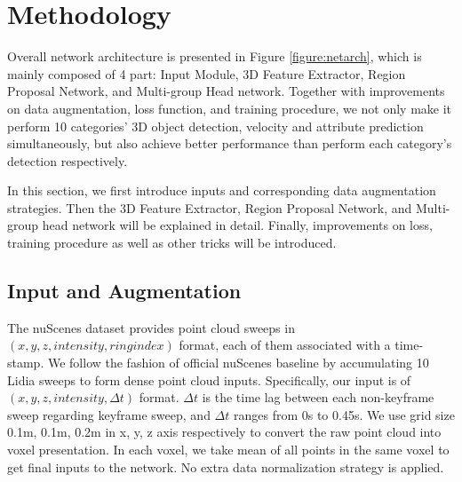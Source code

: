 \documentclass[10pt,twocolumn,letterpaper]{article}
\begin{document}
\section{Methodology} \label{sec:method}
Overall network architecture is presented in Figure \ref{figure:netarch}, which is mainly composed of 4 part: Input Module, 3D Feature Extractor, Region Proposal Network, and Multi-group Head network. Together with improvements on data augmentation, loss function, and training procedure, we not only make it perform 10 categories' 3D object detection, velocity and attribute prediction simultaneously, but also achieve better performance than perform each category's detection respectively.


In this section, we first introduce inputs and corresponding data augmentation strategies. Then the 3D Feature Extractor, Region Proposal Network, and Multi-group head network will be explained in detail. Finally, improvements on loss, training procedure as well as other tricks will be introduced.

\subsection{Input and Augmentation} \label{datasetaug}

The nuScenes dataset provides point cloud sweeps in $(x, y, z, intensity, ring index)$ format, each of them associated with a time-stamp. We follow the fashion of official nuScenes baseline \cite{nuscenes}  by accumulating 10 Lidia sweeps to form dense point cloud inputs. Specifically, our input is of $(x, y, z, intensity, \Delta t)$ format. $\Delta t$ is the time lag between each non-keyframe sweep regarding keyframe sweep, and $\Delta t$ ranges from 0s to 0.45s. We use grid size 0.1m, 0.1m, 0.2m in x, y, z axis respectively to convert the raw point cloud into voxel presentation. In each voxel, we take mean of all points in the same voxel to get final inputs to the network. No extra data normalization strategy is applied.
\end{document}

